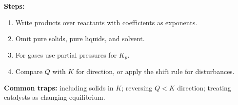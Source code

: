 \textbf{Steps:}
\begin{enumerate}
    \item Write products over reactants with coefficients as exponents.
    \item Omit pure solids, pure liquids, and solvent.
    \item For gases use partial pressures for \(K_p\).
    \item Compare \(Q\) with \(K\) for direction, or apply the shift rule for disturbances.
\end{enumerate}

\textbf{Common traps:} including solids in \(K\); reversing \(Q<K\) direction; treating catalysts as changing equilibrium.

